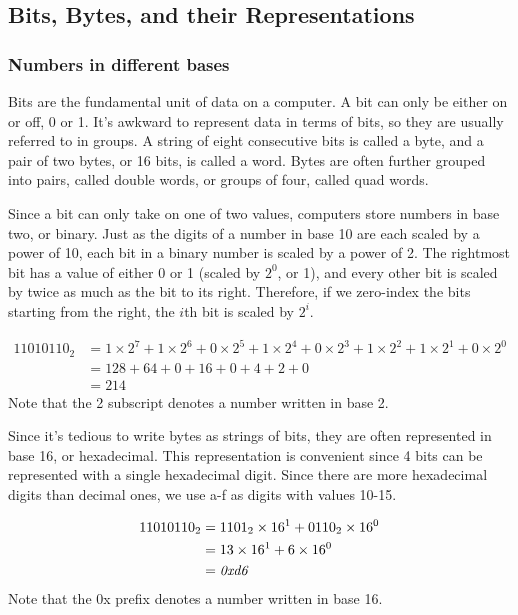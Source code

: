 \subsection{Bits, Bytes, and their Representations}
\subsubsection{Numbers in different bases}
Bits are the fundamental unit of data on a computer. A bit can only be either on
or off, 0 or 1. It's awkward to represent data in terms of bits, so they are
usually referred to in groups. A string of eight consecutive bits is called a
byte, and a pair of two bytes, or 16 bits, is called a word. Bytes are often
further grouped into pairs, called double words, or groups of four, called quad
words.

Since a bit can only take on one of two values, computers store numbers in base
two, or binary. Just as the digits of a number in base 10 are each scaled by a
power of 10, each bit in a binary number is scaled by a power of 2. The
rightmost bit has a value of either 0 or 1 (scaled by $2^0$, or 1), and every
other bit is scaled by twice as much as the bit to its right. Therefore, if we
zero-index the bits starting from the right, the $i$th bit is scaled by $2^i$.

\begin{exmp}
\begin{align*}
11010110_2 & = 1 \times 2^7 + 1 \times 2^6 + 0 \times 2^5 + 1 \times 2^4 + 0 \times 2^3 + 1 \times 2^2 + 1 \times 2^1 + 0 \times 2^0 \\
           & = 128 + 64 + 0 + 16 + 0 + 4 + 2 + 0 \\
           & = 214
\end{align*}
Note that the 2 subscript denotes a number written in base 2.
\end{exmp}

Since it's tedious to write bytes as strings of bits, they are often represented
in base 16, or hexadecimal. This representation is convenient since 4 bits can
be represented with a single hexadecimal digit. Since there are more hexadecimal
digits than decimal ones, we use a-f as digits with values 10-15.

\begin{exmp}
\begin{align*}
11010110_2 &= 1101_2 \times 16^1 + 0110_2 \times 16^0 \\
           &= 13 \times 16^1 + 6 \times 16^0 \\
           &= \emph{0xd6}
\end{align*}
Note that the 0x prefix denotes a number written in base 16.
\end{exmp}

